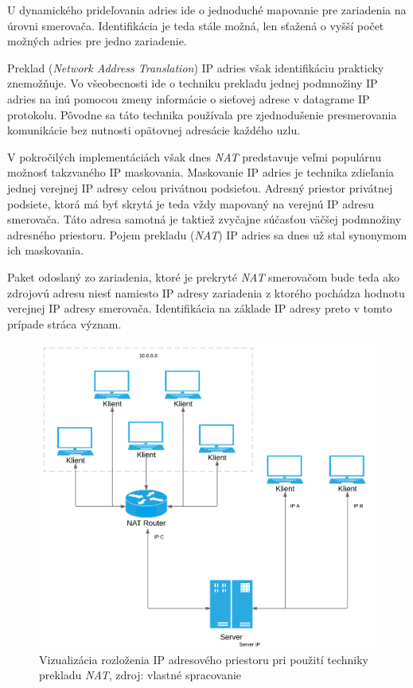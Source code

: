 \documentclass[
  digital, %
  table,   %
  lof,     %
  nolot,   %
  nocover
]{fithesis3}
\begin{document}
U dynamického prideľovania adries ide o jednoduché mapovanie pre zariadenia
na úrovni smerovača. Identifikácia je teda stále možná, len sťažená o vyšší
počet možných adries pre jedno zariadenie.

Preklad (\textit{Network Address Translation}) IP adries však identifikáciu
prakticky znemožňuje. Vo všeobecnosti ide o techniku prekladu jednej podmnožiny
IP adries na inú pomocou zmeny informácie o sieťovej adrese v datagrame IP
protokolu. Pôvodne sa táto technika používala pre zjednodušenie presmerovania
komunikácie bez nutnosti opätovnej adresácie každého uzlu. 

V pokročilých
implementáciách však dnes \textit{NAT} predstavuje veľmi populárnu možnosť
takzvaného  IP maskovania. Maskovanie IP adries je technika zdieľania jednej
verejnej IP adresy celou privátnou podsieťou. Adresný priestor privátnej
podsiete, ktorá má byť skrytá je teda vždy mapovaný na verejnú IP adresu
smerovača. Táto adresa samotná je taktiež zvyčajne súčasťou väčšej podmnožiny
adresného priestoru. Pojem prekladu (\textit{NAT}) IP adries sa dnes už stal
synonymom ich maskovania. 

Paket odoslaný zo zariadenia, ktoré je prekryté
\textit{NAT} smerovačom bude teda ako zdrojovú adresu niesť namiesto IP adresy
zariadenia z ktorého pochádza hodnotu verejnej IP adresy smerovača.
Identifikácia na základe IP adresy preto v tomto prípade stráca význam.

\begin{figure}[H]
  \centering
    \includegraphics[width=.97\textwidth]{images/tech-IP-NAT.png}
  \caption{Vizualizácia rozloženia IP adresového priestoru pri použití techniky
  prekladu \textit{NAT}, zdroj: vlastné spracovanie}
  \label{fig:tech-IP-NAT}
\end{figure}
\end{document}
